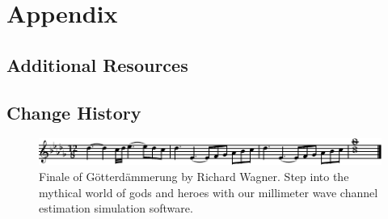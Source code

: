 \documentclass[use boldface]{beaulivre}
\begin{document}
\part*{Appendix}
\chapter{Additional Resources}


\chapter{Change History}


\printbibliography[heading=bibintoc]

\turnoffhypercolor
\printindex

\begin{figure}[!b]
  \centering
  \includegraphics[width=\linewidth]{fig/mtx/ring_finale.pdf}
  \caption*{Finale of G\"otterd\"ammerung by Richard Wagner.
  Step into the mythical world of gods and heroes with our millimeter wave channel estimation simulation software.}
\end{figure}
\end{document}
